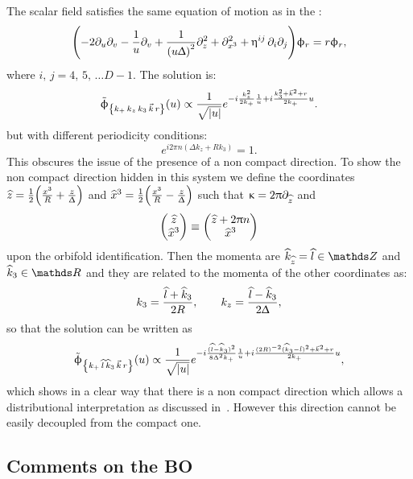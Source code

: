 The scalar field satisfies the same equation of motion as in the \nbo:
\begin{equation}
  \qty(%
    -2 \ipd{u} \ipd{v}
    - \frac{1}{u} \ipd{v}
    + \frac{1}{\qty(u \Delta)^2} \ipd{z}^2
    + \ipd{x^3}^2
    + \eta^{ij}\, \ipd{i} \ipd{j}
  )
  \phi_r
  =
  r \phi_r,
\end{equation}
where $i,\, j = 4,\, 5,\, \dots D - 1$.
The solution is:
\begin{equation}
  \tilde{\upphi}_{\qty{ k_+\, k_z\, {k}_3\, \vec{k}\, r}}( u )
  \propto
  \frac{1}{\sqrt{\abs{u}}}
  e^{-i \frac{k_z^2}{2 k_+ } \frac{1}{u}
     + i \frac{{k}_3^2 + \vec{k}^2 + r}{2 k_+} u}.
\end{equation}
but with different periodicity conditions:
\begin{equation}
  e^{i 2 \pi n ( \Delta k_z + R k_3)}
  =
  1.
\end{equation}
This obscures the issue of the presence of a non compact direction.
To show the non compact direction hidden in this system we define the coordinates $\widehat{z} = \frac{1}{2} \qty( \frac{x^3}{R} + \frac{z}{\Updelta} )$ and $\widehat{x}^3 = \frac{1}{2} \qty( \frac{x^3}{R} - \frac{z}{\Updelta} )$ such that $\upkappa = 2 \uppi \partial_{\widehat{z}}$ and
\begin{equation}
  \mqty( \hatz \\ \hatx^3 )
  \equiv
  \mqty( \hatz + 2 \pi n \\ \hatx^3 )
\end{equation}
upon the orbifold identification.
Then the momenta are $\hatk_{\hatz} = \hatl \in \Z$ and $\hatk_3\in \R$ and they are related to the momenta of the other coordinates as:
\begin{equation}
  k_3
  =
  \frac{\widehat{l} + \widehat{k}_3}{2 R},
  \qquad
  k_z
  =
  \frac{\widehat{l} - \widehat{k}_3}{2 \Updelta},
\end{equation}
so that the solution can be written as
\begin{equation}
    \tilde{\phi}_{\qty{ k_+\, \hatl\, \hatk_3\, \vec{k}\, r}}( u )
    \propto
    \frac{1}{\sqrt{\abs{u}}}
    e^{-i \frac{(\hatl - \hatk_3)^2}{8 \Delta^2 k_+ } \frac{1}{u}
      + i \frac{(2 R)^{-2}(\hatk_3-\hat l)^2 + \vec{k}^2 + r}{2 k_+} u},
\end{equation}
which shows in a clear way that there is a non compact direction which allows a distributional interpretation as discussed in~\cite{Liu:2002:StringsTimeDependentOrbifolds}.
However this direction cannot be easily decoupled from the compact one.


\subsection{Comments on the BO}
\label{sec:BO}

